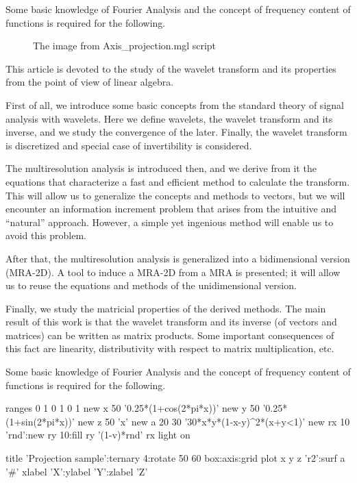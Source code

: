 \documentclass[letterpaper,10pt]{article}
\begin{document}
  Some basic knowledge of Fourier Analysis and the concept of frequency content of functions is required for the following.
  \begin{figure}[!ht]
    \centering
    \caption{The image from Axis\_projection.mgl script}
  \end{figure}
  
  \noindent This article is devoted to the study of the wavelet transform and its properties from the point of view of linear algebra.
  
  First of all, we introduce some basic concepts from the standard theory of signal analysis with wavelets. Here we define wavelets, the wavelet transform and its inverse, and we study the convergence of the later. Finally, the wavelet transform is discretized and special case of invertibility is considered.
  
  The multiresolution analysis is introduced then, and we derive from it the equations that characterize a fast and efficient method to calculate the transform. This will allow us to generalize the concepts and methods to vectors, but we will encounter an information increment problem that arises from the intuitive and ``natural'' approach. However, a simple yet ingenious method will enable us to avoid this problem.
  
  After that, the multiresolution analysis is generalized into a bidimensional version (MRA-2D). A tool to induce a MRA-2D from a MRA is presented; it will allow us to reuse the equations and methods of the unidimensional version.
  
  Finally, we study the matricial properties of the derived methods. The main result of this work is that the wavelet transform and its inverse (of vectors and matrices) can be written as matrix products. Some important consequences of this fact are linearity, distributivity with respect to matrix multiplication, etc.
  
  Some basic knowledge of Fourier Analysis and the concept of frequency content of functions is required for the following.
  \begin{mglverbatim}
ranges 0 1 0 1 0 1
new x 50 '0.25*(1+cos(2*pi*x))'
new y 50 '0.25*(1+sin(2*pi*x))'
new z 50 'x'
new a 20 30 '30*x*y*(1-x-y)^2*(x+y<1)'
new rx 10 'rnd':new ry 10:fill ry '(1-v)*rnd' rx
light on

title 'Projection sample':ternary 4:rotate 50 60
box:axis:grid
plot x y z 'r2':surf a '#'
xlabel 'X':ylabel 'Y':zlabel 'Z'
  \end{mglverbatim}
  
\end{document}
